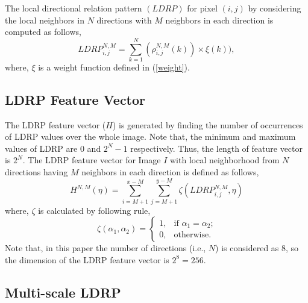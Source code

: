 \documentclass[a4paper]{article}
\begin{document}
The local directional relation pattern $(LDRP)$ for pixel $(i, j)$ by considering the local neighbors in $N$ directions with $M$ neighbors in each direction is computed as follows,
\begin{equation}
LDRP_{i,j}^{N,M} = \sum_{k=1}^{N}(\rho_{i,j}^{N,M}(k)) \times \xi(k)),
\end{equation}
where, $\xi$ is a weight function defined in (\ref{weight}).


\subsection{LDRP Feature Vector}
The LDRP feature vector ($H$) is generated by finding the number of occurrences of LDRP values over the whole image. Note that, the minimum and maximum values of LDRP are $0$ and $2^N-1$ respectively. Thus, the length of feature vector is $2^N$. The LDRP feature vector for Image $I$ with local neighborhood from $N$ directions having $M$ neighbors in each direction is defined as follows,
\begin{equation}
H^{N,M}(\eta) = \sum_{i=M+1}^{x-M}\sum_{j=M+1}^{y-M} \zeta(LDRP_{i,j}^{N,M}, \eta)
\end{equation}
where, $\zeta$ is calculated by following rule,
\begin{equation}
\zeta(\alpha_1, \alpha_2) = 
\begin{cases}
1,	&\text{if $\alpha_1 = \alpha_2$;}\\
0,	&\text{otherwise.}
\end{cases}
\end{equation}
Note that, in this paper the number of directions (i.e., $N$) is considered as $8$, so the dimension of the LDRP feature vector is $2^8=256$.

\subsection{Multi-scale LDRP}
\end{document}
